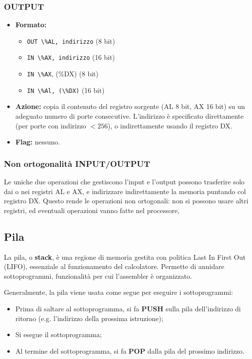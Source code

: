 \documentclass[a4paper,11pt]{article}
\begin{document}
\subsubsection{OUTPUT}
\begin{itemize}
	\item \textbf{Formato:}
		\begin{itemize}
			\item \lstinline|OUT \%AL, indirizzo| (8 bit)
			\item \lstinline|IN \%AX, indirizzo| (16 bit)
			\item \lstinline|IN \%AX|, (\%DX) (8 bit) 
			\item \lstinline|IN \%Al, (\%DX)| (16 bit)
		\end{itemize}
	\item \textbf{Azione:} copia il contenuto del registro sorgente (AL 8 bit, AX 16 bit) su un adeguato numero di porte consecutive.
		L'indirizzo è specificato direttamente (per porte con indirizzo $<256$), o indirettamente usando il registro DX.
	\item \textbf{Flag:} nessuno.
\end{itemize}

\subsubsection{Non ortogonalità INPUT/OUTPUT}
Le uniche due operazioni che gestiscono l'input e l'output possono trasferire solo dai o nei registri AL e AX, e indirizzare indirettamente la memoria puntando col registro DX.
Questo rende le operazioni non ortogonali: non si possono usare altri registri, ed eventuali operazioni vanno fatte nel processore,

\subsection{Pila}
La pila, o \textbf{stack}, è una regione di memoria gestita con politica Last In First Out (LIFO), essenziale al funzionamento del calcolatore.
Permette di annidare sottoprogrammi, funzionalità per cui l'assembler è organizzato.

Generalmente, la pila viene usata come segue per eseguire i sottoprogrammi:
\begin{itemize}
	\item Prima di saltare al sottoprogramma, si fa \textbf{PUSH} sulla pila dell'indirizzo di ritorno (e.g. l'indirizzo della prossima istruzione);
	\item Si esegue il sottoprogramma;
	\item Al termine del sottoprogramma, si fa \textbf{POP} dalla pila del prossimo indirizzo.
\end{itemize}
\end{document}
